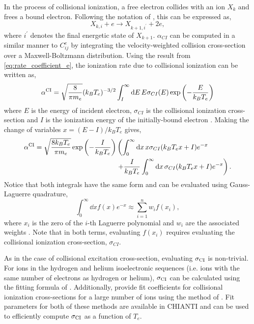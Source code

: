 In the process of collisional ionization, a free electron collides with an ion $X_k$ and frees a bound electron. Following the notation of \citet{bradshaw_collisional_2013,mason_spectroscopic_1994}, this can be expressed as,
\begin{equation}\label{eq:collisional_ionization}
    X_{k,i} + e \to X_{k+1,i^\prime} + 2e,
\end{equation}
where $i^\prime$ denotes the final energetic state of $X_{k+1}$. $\alpha_{CI}$ can be computed in a similar manner to $C^e_{ij}$ by integrating the velocity-weighted collision cross-section over a Maxwell-Boltzmann distribution. Using the result from \autoref{eq:rate_coefficient_e}, the ionization rate due to collisional ionization can be written as,
\begin{equation}
    \alpha^\textup{CI} = \sqrt{\frac{8}{\pi m_e}}(k_BT_e)^{-3/2}\int_I^{\infty}\textup{d}E\,E\sigma_{CI}(E)\exp{\left(-\frac{E}{k_BT_e}\right)}
\end{equation}
where $E$ is the energy of incident electron, $\sigma_{CI}$ is the collisional ionization cross-section and $I$ is the ionization energy of the initially-bound electron \citep{del_zanna_solar_2018}. Making the change of variables $x=(E-I)/k_BT_e$ gives,
\begin{equation}\label{eq:collisional_ionization_x}
\begin{aligned}
    \alpha^\textup{CI} = \sqrt{\frac{8k_BT_e}{\pi m_e}}\exp{\left(-\frac{I}{k_BT_e}\right)}&\left(\int_0^{\infty}\textup{d}x\,x\sigma_{CI}(k_BT_ex+I)e^{-x} \right. \\
    &\left. + \frac{I}{k_BT_e}\int_0^{\infty}\textup{d}x\,\sigma_{CI}(k_BT_ex+I)e^{-x}\right).
\end{aligned}
\end{equation}
Notice that both integrals have the same form and can be evaluated using Gauss-Laguerre quadrature,
\begin{equation}
    \int_0^\infty\dd{x}f(x)e^{-x} \approx \sum_{i=1}^n w_if(x_i),
\end{equation}
where $x_i$ is the zero of the $i$-th Laguerre polynomial and $w_i$ are the associated weights \citep[see Equation 25.4.45 of][]{abramowitz_handbook_1972}. Note that in both terms, evaluating $f(x_i)$ requires evaluating the collisional ionization cross-section, $\sigma_{CI}$.

As in the case of collisional excitation cross-section, evaluating $\sigma_\textup{CI}$ is non-trivial. For ions in the hydrogen and helium isoelectronic sequences (i.e. ions with the same number of electrons as hydrogen or helium), $\sigma_\textup{CI}$ can be calculated using the fitting formula of \citet{fontes_fully_1999}. Additionally, \citet{dere_ionization_2007} provide fit coefficients for collisional ionization cross-sections for a large number of ions using the method of \citet{burgess_analysis_1992}. Fit parameters for both of these methods are available in CHIANTI and can be used to efficiently compute $\sigma_\textup{CI}$ as a function of $T_e$.

